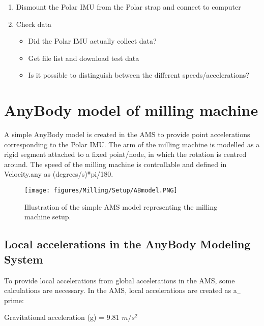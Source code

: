 \begin{enumerate}
    \item Dismount the Polar IMU from the Polar strap and connect to computer
    \item Check data
        \begin{itemize}\vspace{-.3cm}
        \setlength\itemsep{0em}
            \item Did the Polar IMU actually collect data?
            \item Get file list and download test data
            \item Is it possible to distinguish between the different speeds/accelerations?
        \end{itemize}

\end{enumerate}


\newpage
\section{AnyBody model of milling machine}
    A simple AnyBody model is created in the AMS to provide point accelerations corresponding to the Polar IMU. The arm of the milling machine is modelled as a rigid segment attached to a fixed point/node, in which the rotation is centred around. The speed of the milling machine is controllable and defined in Velocity.any as (degrees/s)*pi/180. \\
    
    \begin{figure}[h!]
        \centering
        \texttt{[image: figures/Milling/Setup/ABmodel.PNG]}
        \caption{Illustration of the simple AMS model representing the milling machine setup.}
        \label{fig:my_label}
    \end{figure}
    
    \subsection{Local accelerations in the AnyBody Modeling System}

        To provide local accelerations from global accelerations in the AMS, some calculations are necessary. In the AMS, local accelerations are created as a$_-$prime:
        
        \begin{center}
           Gravitational acceleration (g) = $9.81$ $m/s^2$ 
        \end{center}
        
